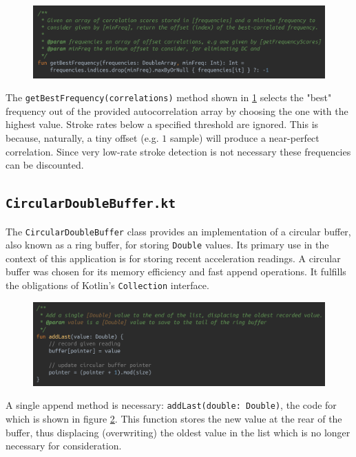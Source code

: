 \documentclass[11pt,twoside,a4paper]{report}
\begin{document}
\begin{figure}[h!]
  \centering
  \includegraphics[width=1.0\textwidth]{code-autocorrelator-getBestFrequency.png}
  \caption{}
  \label{fig:getBestFrequency}
\end{figure}

The \texttt{getBestFrequency(correlations)} method shown in \ref{fig:getBestFrequency} selects the "best" frequency out of the provided autocorrelation array by choosing the one with the highest value. Stroke rates below a specified threshold are ignored. This is because, naturally, a tiny offset (e.g. $1$ sample) will produce a near-perfect correlation. Since very low-rate stroke detection is not necessary these frequencies can be discounted.

\subsection{\texttt{CircularDoubleBuffer.kt}}\label{CircularDoubleBufferkt}

The \texttt{CircularDoubleBuffer} class provides an implementation of a circular buffer, also known as a ring buffer, for storing \texttt{Double} values. Its primary use in the context of this application is for storing recent acceleration readings. A circular buffer was chosen for its memory efficiency and fast append operations. It fulfills the obligations of Kotlin's \texttt{Collection} interface.

\begin{figure}[h!]
  \centering
  \includegraphics[width=1.0\textwidth]{code-CircularDoubleBuffer-addLast.png}
  \caption{}
  \label{fig:addLast}
\end{figure}

A single append method is necessary: \texttt{addLast(double: Double)}, the code for which is shown in figure \ref{fig:addLast}. This function stores the new value at the rear of the buffer, thus displacing (overwriting) the oldest value in the list which is no longer necessary for consideration. 
\end{document}
